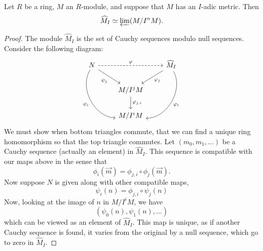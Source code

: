 \documentclass{ximera}
\begin{document}
\begin{theorem}
  Let $R$ be a ring, $M$ an $R$-module, and suppose that $M$ has an
  $I$-adic metric. Then
  \[
  \widehat{M}_I \simeq \varprojlim(M/I^n M).
  \]
  \begin{proof}
    The module $\hat{M}_I$ is the set of Cauchy sequences modulo null
    sequences.  Consider the following diagram:
    \[
    \begin{tikzcd}
      N\ar[ddr,bend right=60,swap,"\psi_i"] \ar[dr,swap,"\psi_j"]  \ar[dashed,rr,"\ph"] &   &  \hat{M}_{I} \ar[ddl,bend left=60,"\ph_i"] \ar[dl,"\ph_j"]\\
      & M/I^jM \ar[d,"\ph_{j,i}"] &\\
      & M/I^iM &
    \end{tikzcd}
    \]
    We must show when bottom triangles commute, that we can find a
    unique ring homomorphism so that the top triangle commutes. Let
    $(m_0,m_1,\dots)$ be a Cauchy sequence (actually an element) in
    $\hat{M}_I$. This sequence is compatible with our maps above in
    the sense that
    \[
    \phi_i(\vec{m}) = \phi_{j,i} \circ \phi_j(\vec{m}).
    \]
    Now suppose $N$ is given along with other compatible maps,
    \[
    \psi_i(n) = \phi_{j,i}\circ \psi_j(n)
    \]
    Now, looking at the image of $n$ in $M/I^iM$, we have
    \[
    (\psi_0(n), \psi_1(n),\dots)
    \]
    which can be viewed as an element of $\hat{M}_{I}$. This map is
    unique, as if another Cauchy sequence is found, it varies from the
    original by a null sequence, which go to zero in $\hat{M}_{I}$.
  \end{proof}
\end{theorem}
\end{document}
